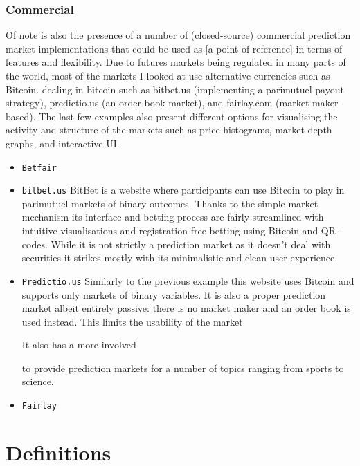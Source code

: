\documentclass[bsc,frontabs,twoside,singlespacing,parskip,deptreport]{infthesis}     %
\begin{document}
\subsection{ Commercial }
	Of note is also the presence of a number of (closed-source) commercial prediction market implementations that could be used as [a point of reference] in terms of features and flexibility. Due to futures markets being regulated in many parts of the world, most of the markets I looked at use alternative currencies such as Bitcoin. 
 dealing in bitcoin such as bitbet.us (implementing a parimutuel payout strategy), predictio.us (an order-book market), and fairlay.com (market maker-based). The last few examples also present different options for visualising the activity and structure of the markets such as price histograms, market depth graphs, and interactive UI.
\begin{itemize}

\item {\tt Betfair}

\item {\tt bitbet.us}
	BitBet is a website where participants can use Bitcoin to play in parimutuel markets of binary outcomes. Thanks to the simple market mechanism its interface and betting process are fairly streamlined with intuitive visualisations and registration-free betting using Bitcoin and QR-codes. While it is not strictly a prediction market as it doesn't deal with securities it strikes mostly with its minimalistic and clean user experience. 

\item {\tt Predictio.us}
	Similarly to the previous example this website uses Bitcoin and supports only markets of binary variables. It is also a proper prediction market albeit entirely passive: there is no market maker and an order book is used instead. This limits the usability of the market 

	It also has a more involved 

to provide prediction markets for a number of topics ranging from sports to science. 
\item {\tt Fairlay}	
	

\end{itemize}
\chapter{Definitions}
\end{document}
